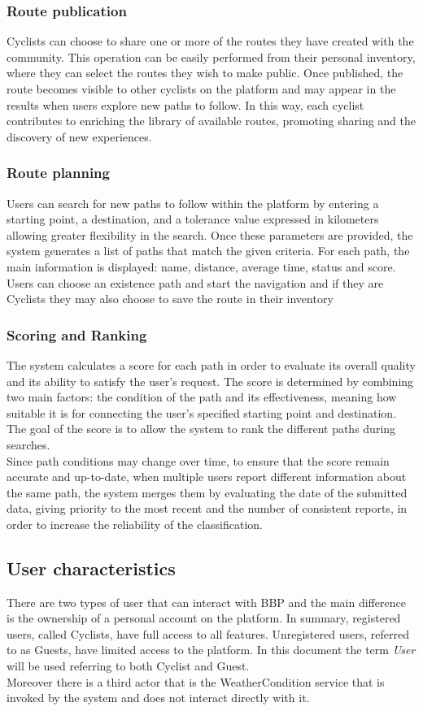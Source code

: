 \subsubsection {Route publication}
Cyclists can choose to share one or more of the routes they have created with the community.
This operation can be easily performed from their personal inventory, where they can select the routes they wish to make public.
Once published, the route becomes visible to other cyclists on the platform and may appear in the results when users explore new paths to follow.
In this way, each cyclist contributes to enriching the library of available routes, promoting sharing and the discovery of new experiences.
\subsubsection {Route planning}
Users can search for new paths to follow within the platform by entering a starting point, a destination, and a tolerance value expressed in kilometers allowing greater flexibility in the search. 
Once these parameters are provided, the system generates a list of paths that match the given criteria.
For each path, the main information is displayed: name, distance, average time, status and score.
Users can choose an existence path and start the navigation and if they are Cyclists they may also choose to save the route in their inventory 
\subsubsection {Scoring and Ranking}
The system calculates a score for each path in order to evaluate its overall quality and its ability to satisfy the user’s request.
The score is determined by combining two main factors: the condition of the path and its effectiveness, meaning how suitable it is for connecting the user’s specified starting point and destination. The goal of the score is to allow the system to rank the different paths during searches. \\ Since path conditions may change over time, to ensure that the score remain accurate and up-to-date, when multiple users report different information about the same path, the system merges them by evaluating the date of the submitted data, giving priority to the most recent and the number of consistent reports, in order to increase the reliability of the classification.
\subsection{User characteristics}
There are two types of user that can interact with BBP and the main difference is the ownership of a personal account on the platform. In summary, registered users, called Cyclists, have full access to all features. Unregistered users, referred to as Guests, have limited access to the platform. In this document the term \textit{User} will be used referring to both Cyclist and Guest. \\Moreover there is a third actor that is the WeatherCondition service that is invoked by the system and does not interact directly with it. 
